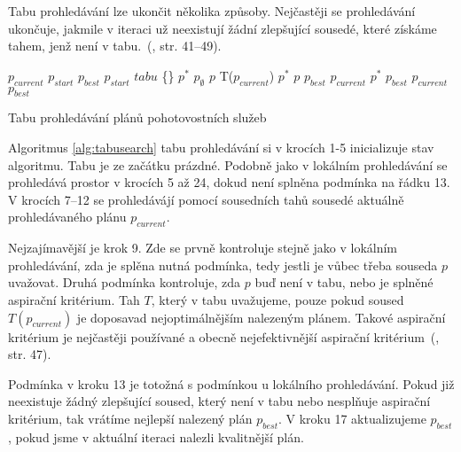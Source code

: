 Tabu prohledávání lze ukončit několika způsoby. Nejčastěji se prohledávání ukončuje, jakmile v iteraci už neexistují žádní zlepšující sousedé,
které získáme tahem, jenž není v tabu.~(\citet{GlovKoch03}, str. 41--49). 

\begin{algorithm}[H]
  \begin{algorithmic}[1]
    \State $p_{current}$ \gets $p_{start}$
    \State $p_{best}$ \gets $p_{start}$
    \State $tabu$ \gets \{\}
      \State $p^*$ \gets $p_{\emptyset}$ 
        \State $p$ \gets T($p_{current}$)
          \State $p^*$ \gets $p$
        \EndIf
      \EndFor
        \State \Return $p_{best}$
      \EndIf
      \State $p_{current}$ \gets $p^*$
        \State $p_{best}$ \gets $p_{current}$
      \EndIf
      \State {}
        \State {} 
      \EndIf
    \EndWhile
    \State \Return $p_{best}$
  \EndFunction
  \end{algorithmic}
  \caption{Tabu prohledávání plánů pohotovostních služeb}
  \label{alg:tabusearch}
\end{algorithm}

Algoritmus \ref{alg:tabusearch} tabu prohledávání si v krocích 1-5 inicializuje stav algoritmu. Tabu je ze začátku prázdné.
Podobně jako v lokálním prohledávání se prohledává prostor v krocích 5 až 24, dokud není splněna podmínka na řádku 13.
V krocích 7--12 se prohledávájí pomocí sousedních tahů sousedé aktuálně prohledávaného plánu $p_{current}$. 

Nejzajímavější je krok 9. Zde se prvně kontroluje stejně jako v lokálním prohledávání, zda je splěna nutná podmínka, tedy jestli je vůbec třeba souseda $p$ uvažovat.
Druhá podmínka kontroluje, zda $p$ buď není v tabu, nebo je splněné aspirační kritérium.
Tah $T$, který v tabu uvažujeme, pouze pokud soused $T(p_{current})$ je doposavad nejoptimálnějším nalezeným plánem.
Takové aspirační kritérium je nejčastěji používané a obecně nejefektivnější aspirační kritérium~(\citet{GlovKoch03}, str. 47).

Podmínka v kroku 13 je totožná s podmínkou u lokálního prohledávání.
Pokud již neexistuje žádný zlepšující soused, který není v tabu nebo nesplňuje aspirační kritérium, tak vrátíme nejlepší nalezený plán $p_{best}$.
V kroku 17 aktualizujeme $p_{best}$, pokud jsme v aktuální iteraci nalezli kvalitnější plán.


